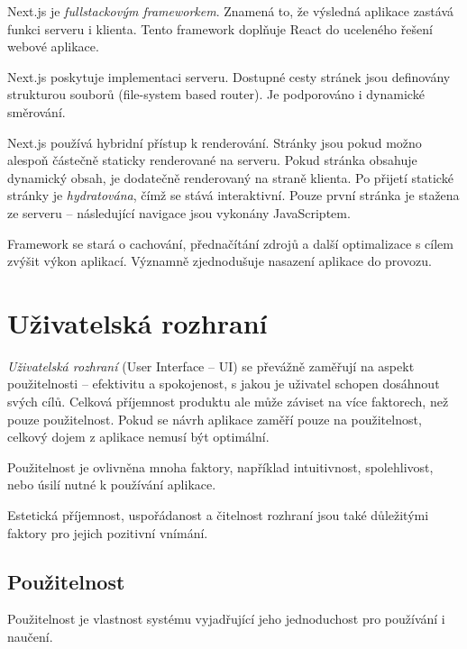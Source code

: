 Next.js je \emph{fullstackovým frameworkem}.
Znamená to, že výsledná aplikace zastává funkci serveru i klienta.
Tento framework doplňuje React do uceleného řešení webové aplikace.

Next.js poskytuje implementaci serveru.
Dostupné cesty stránek jsou definovány strukturou souborů (file-system based router).
Je podporováno i dynamické směrování.

Next.js používá hybridní přístup k renderování.
Stránky jsou pokud možno alespoň částečně staticky renderované na serveru.
Pokud stránka obsahuje dynamický obsah, je dodatečně renderovaný na straně klienta.
Po přijetí statické stránky je \emph{hydratována}, čímž se stává interaktivní.
Pouze první stránka je stažena ze serveru -- následující navigace jsou vykonány JavaScriptem.

Framework se stará o cachování, přednačítání zdrojů a další optimalizace s cílem zvýšit výkon aplikací.
Významně zjednodušuje nasazení aplikace do provozu.


\section{Uživatelská rozhraní}


\emph{Uživatelská rozhraní} (User Interface -- UI) se převážně zaměřují na aspekt použitelnosti -- efektivitu a spokojenost, s jakou je uživatel schopen dosáhnout svých cílů.
Celková příjemnost produktu ale může záviset na více faktorech, než pouze použitelnost.
Pokud se návrh aplikace zaměří pouze na použitelnost, celkový dojem z aplikace nemusí být optimální. 
\cite{pleasureInProduct}

Použitelnost je ovlivněna mnoha faktory, například intuitivnost, spolehlivost, nebo úsilí nutné k používání aplikace.

Estetická příjemnost, uspořádanost a čitelnost rozhraní jsou také důležitými faktory pro jejich pozitivní vnímání. \cite{webAesthetics}

\subsection{Použitelnost}

Použitelnost je vlastnost systému vyjadřující jeho jednoduchost pro používání i naučení.

